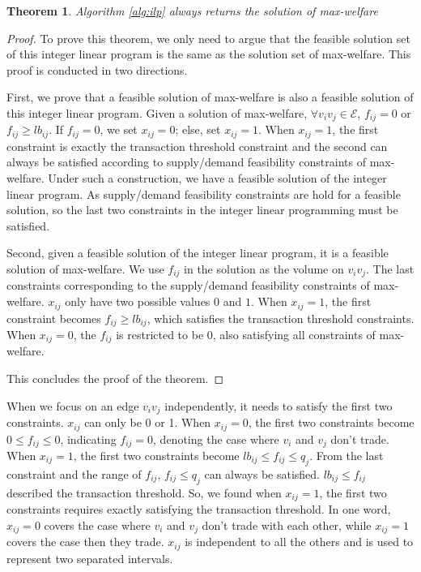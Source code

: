 \documentclass{aamas2015}
\newtheorem{theorem}{Theorem}%
\begin{document}
\begin{theorem}\label{thm:ilp}
	Algorithm \ref{alg:ilp} always returns the solution of {\sc max-welfare}
\end{theorem}

\begin{proof}
To prove this theorem, we only need to argue that the feasible solution set of this integer linear program is the same as the solution set of {\sc max-welfare}.
This proof is conducted in two directions.

First, we prove that a feasible solution of {\sc max-welfare} is also a feasible solution of this integer linear program.
Given a solution of {\sc max-welfare}, $\forall v_iv_j\in \mathcal{E}$, $f_{ij}=0$ or $f_{ij}\geq lb_{ij}$.
If $f_{ij}=0$, we set $x_{ij}=0$; else, set $x_{ij}=1$.
When $x_{ij}=1$, the first constraint is exactly the transaction threshold constraint and the second can always be satisfied according to supply/demand feasibility constraints of {\sc max-welfare}.
Under such a construction, we have a feasible solution of the integer linear program.
As supply/demand feasibility constraints are hold for a feasible solution, so the last two constraints in the integer linear programming must be satisfied.

Second, given a feasible solution of the integer linear program, it is a feasible solution of {\sc max-welfare}.
We use $f_{ij}$ in the solution as the volume on $v_iv_j$.
The last constraints corresponding to the supply/demand feasibility constraints of {\sc max-welfare}.
$x_{ij}$ only have two possible values $0$ and $1$.
When $x_{ij}=1$, the first constraint becomes $f_{ij}\geq lb_{ij}$, which satisfies the transaction threshold constraints.
When $x_{ij}=0$, the $f_{ij}$ is restricted to be 0, also satisfying all constraints of {\sc max-welfare}.

This concludes the proof of the theorem.
\end{proof}

When we focus on an edge $v_iv_j$ independently, it needs to satisfy the first two constraints.
$x_{ij}$ can only be 0 or 1.
When $x_{ij}=0$, the first two constraints become $0\leq f_{ij}\leq 0$, indicating $f_{ij}=0$, denoting the case where $v_i$ and $v_j$ don't trade.
When $x_{ij}=1$, the first two constraints become $lb_{ij}\leq f_{ij}\leq q_j$.
From the last constraint and the range of $f_{ij}$, $f_{ij}\leq q_j$ can always be satisfied.
$lb_{ij}\leq f_{ij}$ described the transaction threshold.
So, we found when $x_{ij}=1$, the first two constraints requires exactly satisfying the transaction threshold.
In one word, $x_{ij}=0$ covers the case where $v_i$ and $v_j$ don't trade with each other, while $x_{ij}=1$ covers the case then they trade.
$x_{ij}$ is independent to all the others and is used to represent two separated intervals.
\end{document}
